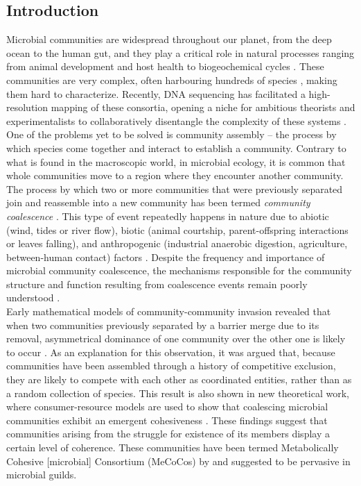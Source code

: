 \documentclass[titlepage,11pt]{article}
\begin{document}
\begin{linenumbers}
\begin{singlespace}
		\section{Introduction}
		Microbial communities are widespread throughout our planet, from the deep ocean to the human gut, and they play a critical role in natural processes ranging from animal development and host health \citep{Huttenhower2012} to biogeochemical cycles \citep{Falkowski2008}. These communities are very complex, often harbouring hundreds of species \citep{Gilbert2014}, making them hard to characterize. Recently, DNA sequencing has facilitated a high-resolution mapping of these consortia, opening a niche for ambitious theorists and experimentalists to collaboratively disentangle the complexity of these systems \citep{Marsland2019, Goldford2018, Goyal2018, Friedman2017, Costello2012, Vila2019}. One of the problems yet to be solved is community assembly -- the process by which species come together and interact to establish a community. Contrary to what is found in the macroscopic world, in microbial ecology, it is common that whole communities move to a region where they encounter another community. The process by which two or more communities that were previously separated join and reassemble into a new community has been termed \textit{community coalescence} \citep{Rillig2015}. This type of event repeatedly happens in nature due to abiotic (wind, tides or river flow), biotic (animal courtship, parent-offspring interactions or leaves falling), and anthropogenic (industrial anaerobic digestion, agriculture, between-human contact) factors \citep{Castledine2020}. Despite the frequency and importance of microbial community coalescence, the mechanisms responsible for the community structure and function resulting from coalescence events remain poorly understood \citep{Rillig2016b}.\\
		Early mathematical models of community-community invasion revealed that when two communities previously separated by a barrier merge due to its removal, asymmetrical dominance of one community over the other one is likely to occur \citep{Gilpin1994, Toquenaga1997}. As an explanation for this observation, it was argued that, because communities have been assembled through a history of competitive exclusion, they are likely to compete with each other as coordinated entities, rather than as a random collection of species. This result is also shown in new theoretical work, where consumer-resource models are used to show that coalescing microbial communities exhibit an emergent cohesiveness \citep{Tikhonov2016, Tikhonov2017}. These findings suggest that communities arising from the struggle for existence of its members display a certain level of coherence. These communities have been termed Metabolically Cohesive [microbial] Consortium (MeCoCos) by \citet{Pascual-Garcia2020} and suggested to be pervasive in microbial guilds.\\ 

\end{singlespace}
\end{linenumbers}
\end{document}
